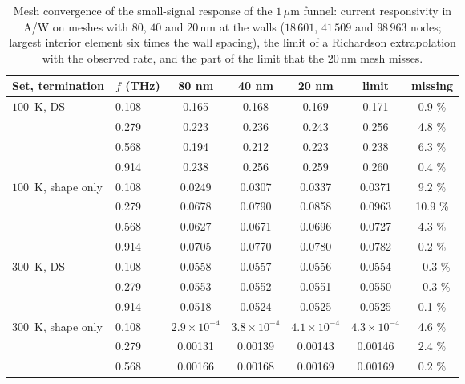 \documentclass[aps,prapplied,onecolumn,superscriptaddress,floatfix]{revtex4-2}
\newcommand{\um}{\,\mu\mathrm{m}}
\newcommand{\nm}{\,\mathrm{nm}}
\begin{document}
\begin{table}[ht]
\caption{Mesh convergence of the small-signal response of the $1\um$
funnel: current responsivity in A/W on meshes with $80$, $40$ and $20\nm$
at the walls ($18\,601$, $41\,509$ and $98\,963$ nodes; largest interior
element six times the wall spacing), the limit of a Richardson
extrapolation with the observed rate, and the part of the limit that the
$20\nm$ mesh misses.}
\label{tab:thzmesh}
\begin{ruledtabular}
\begin{tabular}{llccccc}
Set, termination & $f$ (THz) & 80 nm & 40 nm & 20 nm & limit & missing \\
\hline
$100$~K, DS & 0.108 & 0.165 & 0.168 & 0.169 & 0.171 & 0.9 \% \\
 & 0.279 & 0.223 & 0.236 & 0.243 & 0.256 & 4.8 \% \\
 & 0.568 & 0.194 & 0.212 & 0.223 & 0.238 & 6.3 \% \\
 & 0.914 & 0.238 & 0.256 & 0.259 & 0.260 & 0.4 \% \\
$100$~K, shape only & 0.108 & 0.0249 & 0.0307 & 0.0337 & 0.0371 & 9.2 \% \\
 & 0.279 & 0.0678 & 0.0790 & 0.0858 & 0.0963 & 10.9 \% \\
 & 0.568 & 0.0627 & 0.0671 & 0.0696 & 0.0727 & 4.3 \% \\
 & 0.914 & 0.0705 & 0.0770 & 0.0780 & 0.0782 & 0.2 \% \\
$300$~K, DS & 0.108 & 0.0558 & 0.0557 & 0.0556 & 0.0554 & $-0.3$ \% \\
 & 0.279 & 0.0553 & 0.0552 & 0.0551 & 0.0550 & $-0.3$ \% \\
 & 0.914 & 0.0518 & 0.0524 & 0.0525 & 0.0525 & 0.1 \% \\
$300$~K, shape only & 0.108 & $2.9\times10^{-4}$ & $3.8\times10^{-4}$ & $4.1\times10^{-4}$ & $4.3\times10^{-4}$ & 4.6 \% \\
 & 0.279 & 0.00131 & 0.00139 & 0.00143 & 0.00146 & 2.4 \% \\
 & 0.568 & 0.00166 & 0.00168 & 0.00169 & 0.00169 & 0.2 \% \\
\end{tabular}
\end{ruledtabular}
\end{table}
\end{document}
